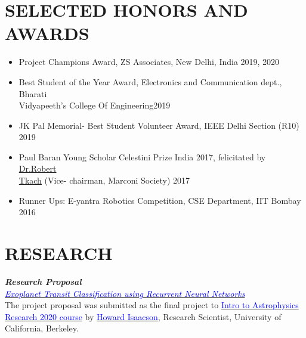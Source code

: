 \documentclass[11pt]{res} %
\newcommand{\titlegap}{5pt} %
\newcommand{\sectgap}{0.05in} %
\begin{document}
\begin{resume}
\section{SELECTED HONORS AND AWARDS}

\vspace{0.2in} 

\begin{itemize}
    \item Project Champions Award, ZS Associates, New Delhi, India \hfill 2019, 2020
    \item Best Student of the Year Award, Electronics and Communication dept., Bharati \\
    Vidyapeeth's College Of Engineering\hfill 2019
    \item{}JK Pal Memorial- Best Student Volunteer Award, IEEE Delhi Section (R10) \hfill 2019
    \item Paul Baran Young Scholar Celestini Prize India 2017, felicitated by \href{https://marconisociety.org/about/board-of-directors/robert-tkach-2/}{Dr.Robert\\
    Tkach} (Vice-
    chairman, Marconi Society) \hfill 2017
    \item Runner Ups: E-yantra Robotics Competition, CSE Department, IIT Bombay \hfill 2016
\end{itemize}

\vspace{\sectgap} 

\hline



\section{\large RESEARCH}

\vspace{\titlegap}

\textbf{\textit{Research Proposal}}\\
\textit{\href{https://drive.google.com/file/d/1Dy6xjWMH5EVmVreHnUj9QBFsuitt-dDZ/view?usp=sharing}{\textcolor{blue}{Exoplanet Transit Classification using Recurrent Neural Networks}}}\\
The project proposal was submitted as the final project to \href{https://github.com/howardisaacson/Intro-to-Astro-2020}{\textcolor{blue}{Intro to Astrophysics Research 2020 course}} by \href{https://hisaacson2.wixsite.com/website}{\textcolor{blue}{Howard Isaacson}}, Research Scientist, University of California, Berkeley.



\end{resume}
\end{document}

